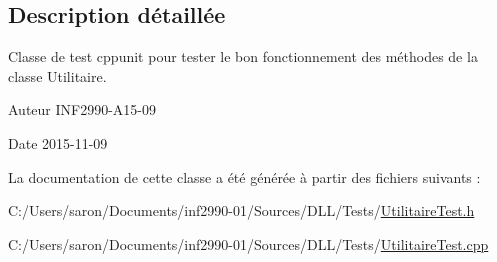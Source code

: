 \subsection{Description détaillée}
Classe de test cppunit pour tester le bon fonctionnement des méthodes de la classe Utilitaire. 

\begin{DoxyAuthor}{Auteur}
I\-N\-F2990-\/\-A15-\/09 
\end{DoxyAuthor}
\begin{DoxyDate}{Date}
2015-\/11-\/09 
\end{DoxyDate}


La documentation de cette classe a été générée à partir des fichiers suivants \-:\begin{DoxyCompactItemize}
\item 
C\-:/\-Users/saron/\-Documents/inf2990-\/01/\-Sources/\-D\-L\-L/\-Tests/\hyperlink{_utilitaire_test_8h}{Utilitaire\-Test.\-h}\item 
C\-:/\-Users/saron/\-Documents/inf2990-\/01/\-Sources/\-D\-L\-L/\-Tests/\hyperlink{_utilitaire_test_8cpp}{Utilitaire\-Test.\-cpp}\end{DoxyCompactItemize}
